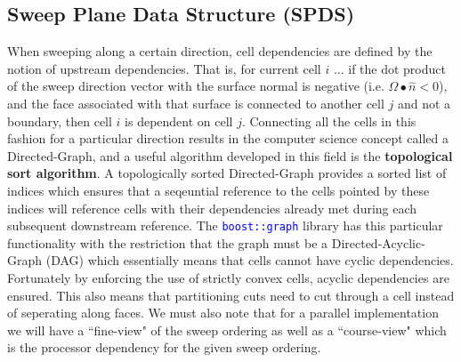 \documentclass[11pt,letterpaper,titlepage]{article}
\newcommand{\xmltag}[1]{\textcolor{blue}{ \texttt{#1}} }
\numberwithin{equation}{section}
\begin{document}
\subsection{Sweep Plane Data Structure (SPDS)}
When sweeping along a certain direction, cell dependencies are defined by the notion of upstream dependencies. That is, for current cell $i$ ... if the dot product of the sweep direction vector with the surface normal is negative (i.e. $\Omega \bullet \hat{n} < 0$), and the face associated with that surface is connected to another cell $j$ and not a boundary, then cell $i$ is dependent on cell $j$. Connecting all the cells in this fashion for a particular direction results in the computer science concept called a Directed-Graph, and a useful algorithm developed in this field is the \textbf{topological sort algorithm}. A topologically sorted Directed-Graph provides a sorted list of indices which ensures that a seqeuntial reference to the cells pointed by these indices will reference cells with their dependencies already met during each subsequent downstream reference.
\newline
\newline
The \xmltag{boost::graph} library has this particular functionality with the restriction that the graph must be a Directed-Acyclic-Graph (DAG) which essentially means that cells cannot have cyclic dependencies. Fortunately by enforcing the use of strictly convex cells, acyclic dependencies are ensured. This also means that partitioning cuts need to cut through a cell instead of seperating along faces. We must also note that for a parallel implementation we will have a ``fine-view" of the sweep ordering as well as a ``course-view" which is the processor dependency for the given sweep ordering.
\newpage
\end{document}
